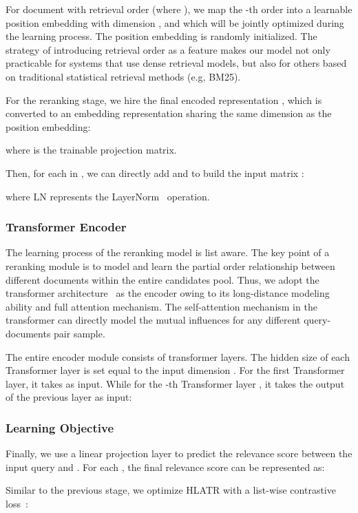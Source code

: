 \documentclass[11pt]{article}
\begin{document}
For document  with retrieval order  (where ), we map the -th order into a learnable position embedding  with dimension , and which will be jointly optimized during the learning process. The position embedding is randomly initialized. The strategy of introducing retrieval order as a feature makes our model not only practicable for systems that use dense retrieval models, but also for others based on traditional statistical retrieval methods (e.g, BM25).

For the reranking stage, we hire the final encoded representation , which is converted to an embedding representation sharing the same dimension as the position embedding:

where  is the trainable projection matrix.


Then, for each  in , we can directly add  and  to build the input matrix :

where LN represents the LayerNorm~\cite{ba2016layer} operation.


\subsubsection{Transformer Encoder} 
The learning process of the reranking model is list aware. The key point of a reranking module is to model and learn the partial order relationship between different documents within the entire candidates pool. Thus, we adopt the transformer architecture~\cite{vaswani2017attention} as the encoder owing to its long-distance modeling ability and full attention mechanism. The self-attention mechanism in the transformer can directly model the mutual influences for any different query-documents pair sample.


The entire encoder module consists of  transformer layers. The hidden size of each Transformer layer is set equal to the input dimension . For the first Transformer layer, it takes  as input. While for the -th Transformer layer , it takes the output of the previous layer as input:



\subsubsection{Learning Objective}
\label{sec:loss}
Finally, we use a linear projection layer to predict the relevance score between the input query  and . For each , the final relevance score can be represented as: 

Similar to the previous stage,  we optimize HLATR with a list-wise contrastive loss~\cite{gao2021rethink}:
\end{document}
